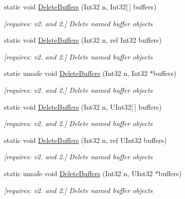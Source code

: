 \begin{DoxyCompactItemize}
static void \hyperlink{class_open_t_k_1_1_graphics_1_1_e_s20_1_1_g_l_aab89ffa97a24d5a9d09cb3068945d823}{Delete\-Buffers} (Int32 n, Int32\mbox{[}$\,$\mbox{]} buffers)
\begin{DoxyCompactList}\small\item\em \mbox{[}requires\-: v2. and 2.\mbox{]} Delete named buffer objects \end{DoxyCompactList}\item 
static void \hyperlink{class_open_t_k_1_1_graphics_1_1_e_s20_1_1_g_l_aa677d08d4b4353d167618d1dabe3a4ed}{Delete\-Buffers} (Int32 n, ref Int32 buffers)
\begin{DoxyCompactList}\small\item\em \mbox{[}requires\-: v2. and 2.\mbox{]} Delete named buffer objects \end{DoxyCompactList}\item 
static unsafe void \hyperlink{class_open_t_k_1_1_graphics_1_1_e_s20_1_1_g_l_ad9f1abd85afdb244f3faf10903f16556}{Delete\-Buffers} (Int32 n, Int32 $\ast$buffers)
\begin{DoxyCompactList}\small\item\em \mbox{[}requires\-: v2. and 2.\mbox{]} Delete named buffer objects \end{DoxyCompactList}\item 
static void \hyperlink{class_open_t_k_1_1_graphics_1_1_e_s20_1_1_g_l_a96fca50876867ac8c4c7a78bdf94ee7e}{Delete\-Buffers} (Int32 n, U\-Int32\mbox{[}$\,$\mbox{]} buffers)
\begin{DoxyCompactList}\small\item\em \mbox{[}requires\-: v2. and 2.\mbox{]} Delete named buffer objects \end{DoxyCompactList}\item 
static void \hyperlink{class_open_t_k_1_1_graphics_1_1_e_s20_1_1_g_l_a5bcc71a1aca73f278305c950714e3232}{Delete\-Buffers} (Int32 n, ref U\-Int32 buffers)
\begin{DoxyCompactList}\small\item\em \mbox{[}requires\-: v2. and 2.\mbox{]} Delete named buffer objects \end{DoxyCompactList}\item 
static unsafe void \hyperlink{class_open_t_k_1_1_graphics_1_1_e_s20_1_1_g_l_ac781b78ca334d924c39b1d855b8183e0}{Delete\-Buffers} (Int32 n, U\-Int32 $\ast$buffers)
\begin{DoxyCompactList}\small\item\em \mbox{[}requires\-: v2. and 2.\mbox{]} Delete named buffer objects \end{DoxyCompactList}\item 

\end{DoxyCompactItemize}
